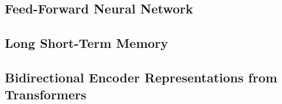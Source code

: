 \subsection{Feed-Forward Neural Network}

\subsection{Long Short-Term Memory}

\subsection{Bidirectional Encoder Representations from Transformers}

